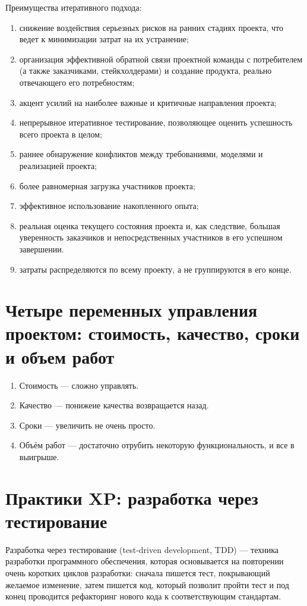 \documentclass{article}
\begin{document}
    Преимущества итеративного подхода:
    \begin{enumerate}
        \item снижение воздействия серьезных рисков на ранних стадиях проекта, что ведет к минимизации затрат на их устранение;
        \item организация эффективной обратной связи проектной команды с потребителем (а также заказчиками, стейкхолдерами) и создание продукта, реально отвечающего его потребностям;
        \item акцент усилий на наиболее важные и критичные направления проекта;
        \item непрерывное итеративное тестирование, позволяющее оценить успешность всего проекта в целом;
        \item раннее обнаружение конфликтов между требованиями, моделями и реализацией проекта;
        \item более равномерная загрузка участников проекта;
        \item эффективное использование накопленного опыта;
        \item реальная оценка текущего состояния проекта и, как следствие, большая уверенность заказчиков и непосредственных участников в его успешном завершении.
        \item затраты распределяются по всему проекту, а не группируются в его конце.
    \end{enumerate}

\section{Четыре переменных управления проектом: стоимость, качество, сроки и объем работ}
    \begin{enumerate}
        \item Стоимость — сложно управлять.
        \item Качество — понижеие качества возвращается назад.
        \item Сроки — увеличить не очень просто.
        \item Объём работ — достаточно отрубить некоторую функциональность, и все в выигрыше.
    \end{enumerate}

\section{Практики XP: разработка через тестирование}
    Разработка через тестирование (test-driven development, TDD) — техника разработки программного обеспечения, которая основывается на повторении очень коротких циклов разработки: сначала пишется тест, покрывающий желаемое изменение, затем пишется код, который позволит пройти тест и под конец проводится рефакторинг нового кода к соответствующим стандартам.
\end{document}
